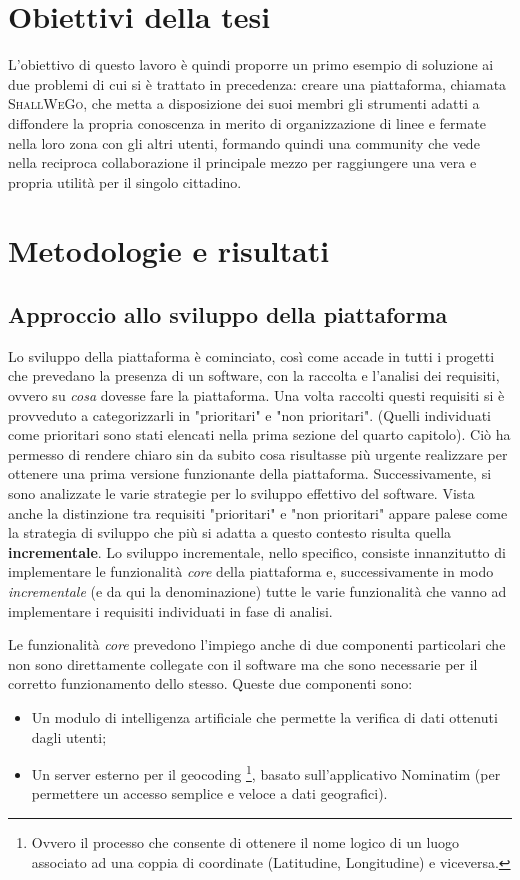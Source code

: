\section{Obiettivi della tesi}
    L'obiettivo di questo lavoro è quindi proporre un primo esempio di soluzione ai due problemi di cui si è trattato in precedenza: creare una piattaforma, chiamata \textsc{ShallWeGo}, che metta a disposizione dei suoi membri gli strumenti adatti a diffondere la propria conoscenza in merito di organizzazione di linee e fermate nella loro zona con gli altri utenti, formando quindi una community che vede nella reciproca collaborazione il principale mezzo per raggiungere una vera e propria utilità per il singolo cittadino.

    
    
\section{Metodologie e risultati}
    \subsection{Approccio allo sviluppo della piattaforma}
        Lo sviluppo della piattaforma è cominciato, così come accade in tutti i progetti che prevedano la presenza di un software, con la raccolta e l'analisi dei requisiti, ovvero su \textit{cosa} dovesse fare la piattaforma. Una volta raccolti questi requisiti si è provveduto a categorizzarli in "prioritari" e "non prioritari". (Quelli individuati come prioritari sono stati elencati nella prima sezione del quarto capitolo). Ciò ha permesso di rendere chiaro sin da subito cosa risultasse più urgente realizzare per ottenere una prima versione funzionante della piattaforma. 
        Successivamente, si sono analizzate le varie strategie per lo sviluppo effettivo del software. Vista anche la distinzione tra requisiti "prioritari" e "non prioritari" appare palese come la strategia di sviluppo che più si adatta a questo contesto risulta quella \textbf{incrementale}. Lo sviluppo incrementale, nello specifico, consiste innanzitutto di implementare le funzionalità \textit{core} della piattaforma e, successivamente in modo \textit{incrementale} (e da qui la denominazione) tutte le varie funzionalità che vanno ad implementare i requisiti individuati in fase di analisi. 
        
        Le funzionalità \textit{core} prevedono l'impiego anche di due componenti particolari che non sono direttamente collegate con il software ma che sono necessarie per il corretto funzionamento dello stesso. Queste due componenti sono:
        \begin{itemize}
            \item Un modulo di intelligenza artificiale che permette la verifica di dati ottenuti dagli utenti;
            \item Un server esterno per il geocoding \footnote[1]{Ovvero il processo che consente di ottenere il nome logico di un luogo associato ad una coppia di coordinate (Latitudine, Longitudine) e viceversa.}, basato sull'applicativo Nominatim (per permettere un accesso semplice e veloce a dati geografici).
        \end{itemize}

